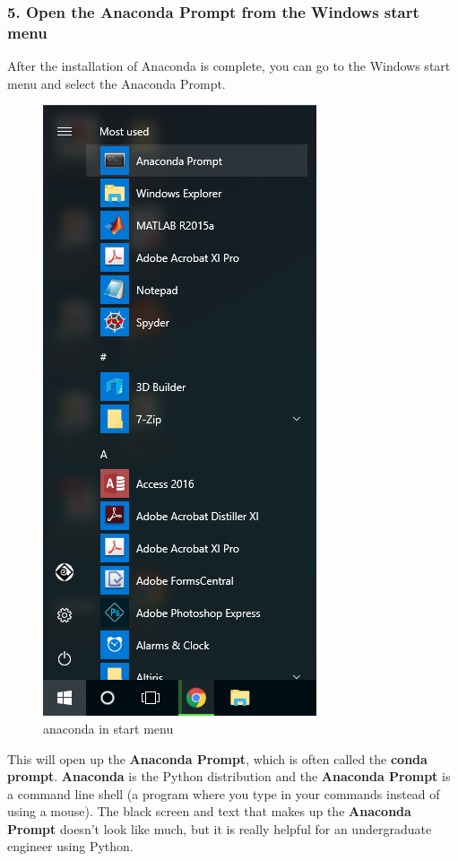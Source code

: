 \documentclass{book}
\makeatletter
\def\maxwidth{\ifdim\Gin@nat@width>\linewidth\linewidth
    \else\Gin@nat@width\fi}
\let\Oldincludegraphics\includegraphics
\renewcommand{\includegraphics}[1]{\Oldincludegraphics[width=.8\maxwidth]{#1}}
\makeatother
\begin{document}
    
        \subsubsection{5. Open the Anaconda Prompt from the Windows start
menu}\label{open-the-anaconda-prompt-from-the-windows-start-menu}

After the installation of Anaconda is complete, you can go to the
Windows start menu and select the Anaconda Prompt.

\begin{figure}
\centering
\includegraphics{images/anaconda_from_start_menu.png}
\caption{anaconda in start menu}
\end{figure}

This will open up the \textbf{Anaconda Prompt}, which is often called
the \textbf{conda prompt}. \textbf{Anaconda} is the Python distribution
and the \textbf{Anaconda Prompt} is a command line shell (a program
where you type in your commands instead of using a mouse). The black
screen and text that makes up the \textbf{Anaconda Prompt} doesn't look
like much, but it is really helpful for an undergraduate engineer using
Python.
\end{document}
